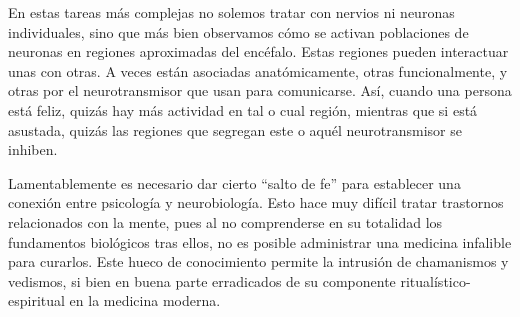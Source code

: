 En estas tareas más complejas no solemos tratar con nervios ni neuronas individuales, sino que más bien observamos cómo se activan poblaciones de neuronas en regiones aproximadas del encéfalo. Estas regiones pueden interactuar unas con otras. A veces están asociadas anatómicamente, otras funcionalmente, y otras por el neurotransmisor que usan para comunicarse. Así, cuando una persona está feliz, quizás hay más actividad en tal o cual región, mientras que si está asustada, quizás las regiones que segregan este o aquél neurotransmisor se inhiben.

Lamentablemente es necesario dar cierto \enquote{salto de fe} para establecer una conexión entre psicología y neurobiología. Esto hace muy difícil tratar trastornos relacionados con la mente, pues al no comprenderse en su totalidad los fundamentos biológicos tras ellos, no es posible administrar una medicina infalible para curarlos. Este hueco de conocimiento permite la intrusión de chamanismos y vedismos, si bien en buena parte erradicados de su componente ritualístico-espiritual en la medicina moderna.
